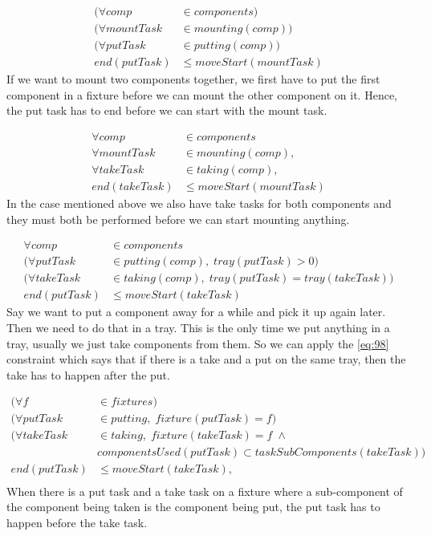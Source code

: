  \begin{equation}
 \begin{aligned}\label{eq:96}
 (\forall comp &\in components) \\
 (\forall mountTask &\in mounting(comp)) \\
 (\forall putTask &\in putting(comp)) \\
 end(putTask) &\le moveStart(mountTask)
 \end{aligned}
 \end{equation}
 If we want to mount two components together, we first have to put the first component in a fixture before we can mount the other component on it. Hence, the put task has to end before we can start with the mount task. 
 
 \begin{equation}
 \begin{aligned}\label{eq:97}
 \forall comp &\in components \\
 \forall mountTask &\in mounting(comp), \\
 \forall takeTask &\in taking(comp), \\
 end(takeTask) &\le moveStart(mountTask)
 \end{aligned}
 \end{equation}
 In the case mentioned above we also have take tasks for both components and they must both be performed before we can start mounting anything. 
 
 \begin{equation}
 \begin{aligned}\label{eq:98}
 \forall comp &\in components \\
 (\forall putTask &\in putting(comp), \; tray(putTask) > 0)\\
 (\forall takeTask &\in taking(comp), \; tray(putTask) = tray(takeTask))\\
 end(putTask) &\le moveStart(takeTask)
 \end{aligned}
 \end{equation}
 Say we want to put a component away for a while and pick it up again later. Then we need to do that in a tray. This is the only time we put anything in a tray, usually we just take components from them. So we can apply the \ref{eq:98} constraint which says that if there is a take and a put on the same tray, then the take has to happen after the put. 
 
 \begin{equation}
 \begin{aligned}\label{eq:99}
 (\forall f &\in fixtures) \\
 (\forall putTask &\in putting, \; fixture(putTask) = f)\\
 (\forall takeTask &\in taking, \; fixture(takeTask) = f \; \land \\
 &componentsUsed(putTask) \subset taskSubComponents(takeTask)) \\
 end(putTask) &\le moveStart(takeTask), \\
 \end{aligned}
 \end{equation}
 When there is a put task and a take task on a fixture where a sub-component of the component being taken is the component being put, the put task has to happen before the take task.
 
